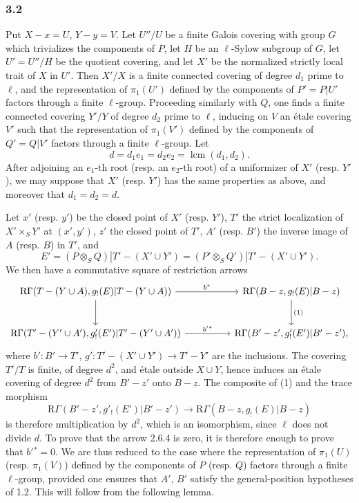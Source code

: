 \subsubsection*{3.2}
Put $X-x=U$, $Y-y=V$. Let $U''/U$ be a finite Galois covering with group $G$ which trivializes the components of $P$, let $H$ be an $\ell$-Sylow subgroup of $G$, let $U'=U''/H$ be the quotient covering, and let $X'$ be the normalized strictly local trait of $X$ in $U'$. Then $X'/X$ is a finite connected covering of degree $d_1$ prime to $\ell$, and the representation of $\pi_1(U')$ defined by the components of $P'=P|U'$ factors through a finite $\ell$-group. Proceeding similarly with $Q$, one finds a finite connected covering $Y'/Y$ of degree $d_2$ prime to $\ell$, inducing on $V$ an étale covering $V'$ such that the representation of $\pi_1(V')$ defined by the components of $Q'=Q|V'$ factors through a finite $\ell$-group. Let
\[
d=d_1e_1=d_2e_2=\operatorname{lcm}(d_1,d_2).
\]
After adjoining an $e_1$-th root (resp. an $e_2$-th root) of a uniformizer of $X'$ (resp. $Y'$), we may suppose that $X'$ (resp. $Y'$) has the same properties as above, and moreover that $d_1=d_2=d$.

Let $x'$ (resp. $y'$) be the closed point of $X'$ (resp. $Y'$), $T'$ the strict localization of $X'\times_S Y'$ at $(x',y')$, $z'$ the closed point of $T'$, $A'$ (resp. $B'$) the inverse image of $A$ (resp. $B$) in $T'$, and
\[
E'=(P\otimes_SQ)|T'-(X'\cup Y')
   =(P'\otimes_SQ')|T'-(X'\cup Y').
\]
We then have a commutative square of restriction arrows
\[
\begin{tikzcd}[column sep=huge,row sep=large]
\mathrm R\Gamma(T-(Y\cup A),g_!(E)|T-(Y\cup A))
 \arrow[r,"b^*"] \arrow[d]
&
\mathrm R\Gamma(B-z,g_!(E)|B-z) \arrow[d,"(1)"]\\
\mathrm R\Gamma(T'-(Y'\cup A'),g'_!(E')|T'-(Y'\cup A'))
 \arrow[r,"b'{}^*"]
&
\mathrm R\Gamma(B'-z',g'_!(E')|B'-z') ,
\end{tikzcd}
\]
where $b':B'\to T'$, $g':T'-(X'\cup Y')\to T'-Y'$ are the inclusions. The covering $T'/T$ is finite, of degree $d^2$, and étale outside $X\cup Y$, hence induces an étale covering of degree $d^2$ from $B'-z'$ onto $B-z$. The composite of (1) and the trace morphism
\[
\mathrm R\Gamma(B'-z',g'_!(E')|B'-z')
 \longrightarrow
\mathrm R\Gamma(B-z,g_!(E)|B-z)
\]
is therefore multiplication by $d^2$, which is an isomorphism, since $\ell$ does not divide $d$. To prove that the arrow 2.6.4 is zero, it is therefore enough to prove that $b'{}^*=0$. We are thus reduced to the case where the representation of $\pi_1(U)$ (resp. $\pi_1(V)$) defined by the components of $P$ (resp. $Q$) factors through a finite $\ell$-group, provided one ensures that $A'$, $B'$ satisfy the general-position hypotheses of 1.2. This will follow from the following lemma.

